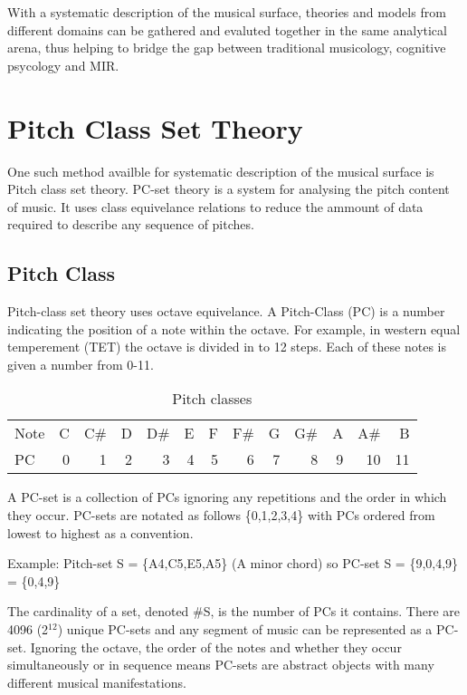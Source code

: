 \documentclass{article}
\begin{document}
With a systematic description of the musical surface, theories and
models from different domains can be gathered and evaluted together in
the same analytical arena, thus helping to bridge the gap between
traditional musicology, cognitive psycology and MIR.
\section{Pitch Class Set Theory}
\label{sec-3}

One such method availble for systematic description of the musical
surface is Pitch class set theory. PC-set theory is a system for
analysing the pitch content of music. It uses class equivelance
relations to reduce the ammount of data required to describe any
sequence of pitches.
\subsection{Pitch Class}
\label{sec-3-1}

Pitch-class set theory uses octave equivelance. A Pitch-Class (PC) is
a number indicating the position of a note within the octave. For
example, in western equal temperement (TET) the octave is divided in
to 12 steps. Each of these notes is given a number from 0-11.
\begin{table}[htb]
\caption{Pitch classes} 
\begin{center}
\begin{tabular}{lrrrrrrrrrrrr}
 Note  &  C  &  C\#  &  D  &  D\#  &  E  &  F  &  F\#  &  G  &  G\#  &  A  &  A\#  &   B  \\
 PC    &  0  &    1  &  2  &    3  &  4  &  5  &    6  &  7  &    8  &  9  &   10  &  11  \\
\end{tabular}
\end{center}
\end{table}

A PC-set is a collection of PCs ignoring any repetitions and the order
in which they occur. PC-sets are notated as follows \{0,1,2,3,4\} with
PCs ordered from lowest to highest as a convention.

Example: Pitch-set S = \{A4,C5,E5,A5\} (A minor chord) so PC-set S =
\{9,0,4,9\} = \{0,4,9\}

The cardinality of a set, denoted \#S, is the number of PCs it
contains. There are 4096 (2$^{\mathrm{12}}$) unique PC-sets and any segment of
music can be represented as a PC-set. Ignoring the octave, the order
of the notes and whether they occur simultaneously or in sequence
means PC-sets are abstract objects with many different musical
manifestations.
\end{document}
